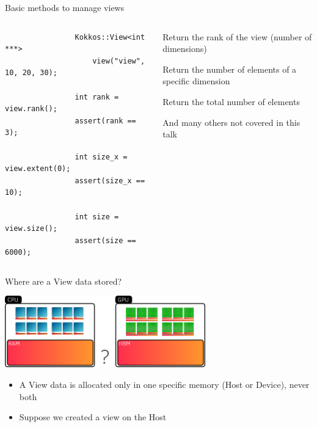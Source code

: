 \documentclass[
    aspectratio=169,
    handout,
]{beamer}
\begin{document}

\begin{frame}[fragile]{Basic methods to manage views}
    \begin{columns}
        \begin{column}{0.45\linewidth}
            \begin{verbatim}
                Kokkos::View<int ***>
                    view("view", 10, 20, 30);

                int rank = view.rank();
                assert(rank == 3);

                int size_x = view.extent(0);
                assert(size_x == 10);

                int size = view.size();
                assert(size == 6000);
            \end{verbatim}
        \end{column}
        \begin{column}{0.55\linewidth}
            \begin{description}
                \item[\texttt{rank()}] Return the rank of the view (number of dimensions)
                \item[\texttt{extent(dim)}] Return the number of elements of a specific dimension
                \item[\texttt{size()}] Return the total number of elements
            \end{description}

            \vspace{0.5em}

            And many others not covered in this talk
        \end{column}
    \end{columns}
\end{frame}


\begin{frame}{Where are a View data stored?}
    \begin{center}
        \includegraphics[width=0.65\textwidth]{view_memory.png}
    \end{center}
    \pause
    \begin{itemize}
        \item A View data is allocated only in one specific memory (Host or Device), never both
        \pause
        \item Suppose we created a view on the Host
    \end{itemize}
\end{frame}
\end{document}
